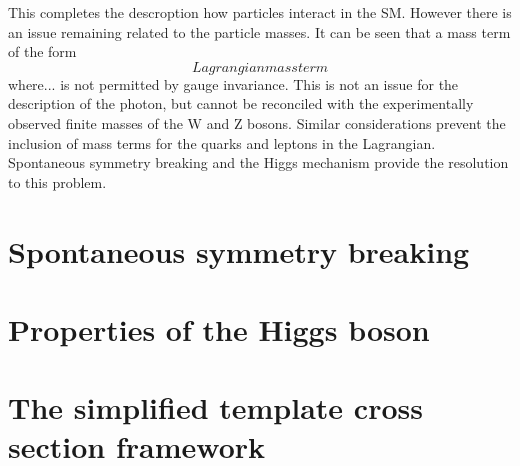 This completes the descroption how particles interact in the SM.
However there is an issue remaining related to the particle masses.
It can be seen that a mass term of the form
\begin{equation}
Lagrangian mass term
\end{equation}
where... 
is not permitted by gauge invariance.
This is not an issue for the description of the photon, 
but cannot be reconciled with the experimentally observed finite masses of the W and Z bosons.
Similar considerations prevent the inclusion of mass terms 
for the quarks and leptons in the Lagrangian.
Spontaneous symmetry breaking and the Higgs mechanism provide the resolution to this problem.

\section{Spontaneous symmetry breaking}


\section{Properties of the Higgs boson}


\section{The simplified template cross section framework}

